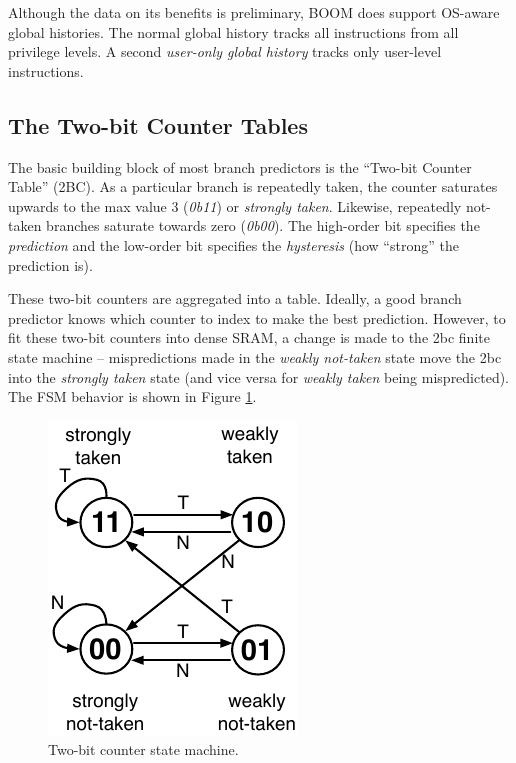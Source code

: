 Although the data on its benefits is preliminary, BOOM does support OS-aware global histories.  The normal global history tracks all instructions from all privilege levels. A second {\em user-only global history} tracks only user-level instructions. 

\subsection{The Two-bit Counter Tables}

The basic building block of most branch predictors is the ``Two-bit Counter Table'' (2BC).  As a particular branch is repeatedly taken, the counter saturates upwards to the max value 3 ({\em 0b11}) or {\em strongly taken}.  Likewise, repeatedly not-taken branches saturate towards zero ({\em 0b00}).  The high-order bit specifies the {\em prediction} and the low-order bit specifies the {\em hysteresis} (how ``strong'' the prediction is).

These two-bit counters are aggregated into a table. Ideally, a good branch predictor knows which counter to index to make the best prediction. However, to fit these two-bit counters into dense SRAM, a change is made to the 2bc finite state machine -- mispredictions made in the {\em weakly not-taken} state move the 2bc into the {\em strongly taken} state (and vice versa for {\em weakly taken} being mispredicted). The FSM behavior is shown in Figure \ref{fig:2bc-fsm}.

\begin{figure}[ht]
	\centering
	\centerline{\includegraphics[scale =1] {figures/2bc-fsm}}
	\caption{ \small Two-bit counter state machine.}
	\label{fig:2bc-fsm}
\end{figure}

